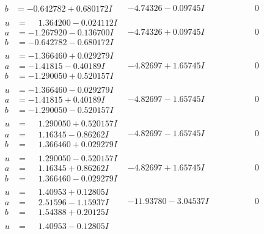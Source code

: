 \documentclass[1p]{elsarticle_modified}
\theoremstyle{definition}
\begin{document}
$$\begin{array}{c|c|c}
\begin{aligned}
b &= -0.642782 + 0.680172 I\end{aligned}
 & -4.74326 - 0.09745 I & \phantom{-0.000000 } 0 \\ \hline\begin{aligned}
u &= \phantom{-}1.364200 - 0.024112 I \\
a &= -1.267920 - 0.136700 I \\
b &= -0.642782 - 0.680172 I\end{aligned}
 & -4.74326 + 0.09745 I & \phantom{-0.000000 } 0 \\ \hline\begin{aligned}
u &= -1.366460 + 0.029279 I \\
a &= -1.41815 - 0.40189 I \\
b &= -1.290050 + 0.520157 I\end{aligned}
 & -4.82697 + 1.65745 I & \phantom{-0.000000 } 0 \\ \hline\begin{aligned}
u &= -1.366460 - 0.029279 I \\
a &= -1.41815 + 0.40189 I \\
b &= -1.290050 - 0.520157 I\end{aligned}
 & -4.82697 - 1.65745 I & \phantom{-0.000000 } 0 \\ \hline\begin{aligned}
u &= \phantom{-}1.290050 + 0.520157 I \\
a &= \phantom{-}1.16345 - 0.86262 I \\
b &= \phantom{-}1.366460 + 0.029279 I\end{aligned}
 & -4.82697 - 1.65745 I & \phantom{-0.000000 } 0 \\ \hline\begin{aligned}
u &= \phantom{-}1.290050 - 0.520157 I \\
a &= \phantom{-}1.16345 + 0.86262 I \\
b &= \phantom{-}1.366460 - 0.029279 I\end{aligned}
 & -4.82697 + 1.65745 I & \phantom{-0.000000 } 0 \\ \hline\begin{aligned}
u &= \phantom{-}1.40953 + 0.12805 I \\
a &= \phantom{-}2.51596 - 1.15937 I \\
b &= \phantom{-}1.54388 + 0.20125 I\end{aligned}
 & -11.93780 - 3.04537 I & \phantom{-0.000000 } 0 \\ \hline\begin{aligned}
u &= \phantom{-}1.40953 - 0.12805 I \\

\end{aligned}
\end{array}$$
\end{document}
